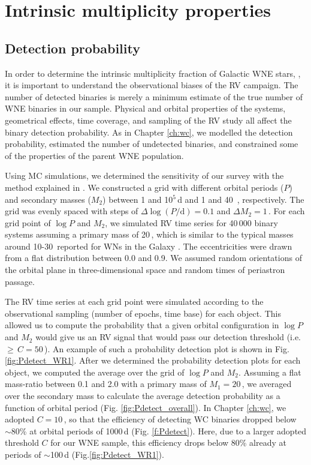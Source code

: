 \section{Intrinsic multiplicity properties}\label{sect:intbinfrac}
\subsection{Detection probability} \label{sect:detection_probability}
In order to determine the intrinsic multiplicity fraction of Galactic WNE stars, \fintWNE{}, it is important to understand the observational biases of the RV campaign. The number of detected binaries is merely a minimum estimate of the true number of  WNE binaries in our sample. Physical and orbital properties of the systems, geometrical effects, time coverage, and sampling of the RV study all affect the binary detection probability. As in Chapter \ref{ch:wc}, we modelled the detection probability, estimated the number of undetected binaries, and constrained some of the properties of the parent WNE population.

Using MC simulations, we determined the sensitivity of our survey with the method explained in \citet{2019Patrick}. We constructed a grid with different orbital periods ($P$) and secondary masses ($M_2$) between 1 and 10$^5$\,d and 1 and 40\,\Msun{} , respectively. The grid was evenly spaced with steps of $\Delta \log (P/\textrm{d}) = 0.1$ and $\Delta M_2 = 1$\,\Msun{}. For each grid point of $\log P$ and $M_2$, we simulated RV time series for 40\,000 binary systems assuming a primary mass of 20\,\Msun{}, which is similar to the typical masses around 10-30\,\Msun{} reported for WNs in the Galaxy \citep{hamann_galactic_2019}. The eccentricities were drawn from a flat distribution between 0.0 and 0.9. We assumed random orientations of the orbital plane in three-dimensional space and random times of periastron passage. 

The RV time series at each grid point were simulated according to the observational sampling (number of epochs, time base) for each object. This allowed us to compute the probability that a given orbital configuration in $\log P$ and $M_2$ would give us an RV signal that would pass our detection threshold (i.e. \DelRV{}\,$\ge\,C=50$\,\kms{}). An example of such a probability detection plot is shown in Fig. \ref{fig:Pdetect_WR1}. After we determined the probability detection plots for each object, we computed the average over the grid of $\log P$ and $M_2$. Assuming a flat mass-ratio between 0.1 and 2.0 with a primary mass of $M_1 = 20$\,\Msun{}, we averaged over the secondary mass to calculate the average detection probability as a function of orbital period (Fig. \ref{fig:Pdetect_overall}). In Chapter \ref{ch:wc}, we adopted $C=10\,$\kms{}, so that the efficiency of detecting WC binaries dropped below ${\sim}80$\% at orbital periods of 1000\,d (Fig. \ref{f:Pdetect}). Here, due to a larger adopted threshold $C$ for our WNE sample, this efficiency drops below 80\% already at periods of ${\sim}$100\,d (Fig.\ref{fig:Pdetect_WR1}). 

